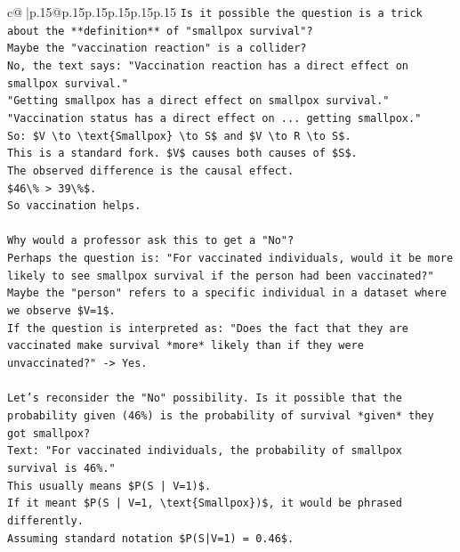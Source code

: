 \documentclass{article}
\begin{document}
{\begin{supertabular}{c@{$\;$}|p{.15\linewidth}@{}p{.15\linewidth}p{.15\linewidth}p{.15\linewidth}p{.15\linewidth}p{.15\linewidth}}
{{{\texttt{Is it possible the question is a trick about the **definition** of "smallpox survival"?} \\
\texttt{Maybe the "vaccination reaction" is a collider?} \\
\texttt{No, the text says: "Vaccination reaction has a direct effect on smallpox survival."} \\
\texttt{"Getting smallpox has a direct effect on smallpox survival."} \\
\texttt{"Vaccination status has a direct effect on ... getting smallpox."} \\
\texttt{So: \$V \textbackslash{}to \textbackslash{}text\{Smallpox\} \textbackslash{}to S\$ and \$V \textbackslash{}to R \textbackslash{}to S\$.} \\
\texttt{This is a standard fork. \$V\$ causes both causes of \$S\$.} \\
\texttt{The observed difference is the causal effect.} \\
\texttt{\$46\textbackslash{}\% > 39\textbackslash{}\%\$.} \\
\texttt{So vaccination helps.} \\
\\ 
\texttt{Why would a professor ask this to get a "No"?} \\
\texttt{Perhaps the question is: "For vaccinated individuals, would it be more likely to see smallpox survival if the person had been vaccinated?"} \\
\texttt{Maybe the "person" refers to a specific individual in a dataset where we observe \$V=1\$.} \\
\texttt{If the question is interpreted as: "Does the fact that they are vaccinated make survival *more* likely than if they were unvaccinated?" {-}> Yes.} \\
\\ 
\texttt{Let's reconsider the "No" possibility. Is it possible that the probability given (46\%) is the probability of survival *given* they got smallpox?} \\
\texttt{Text: "For vaccinated individuals, the probability of smallpox survival is 46\%."} \\
\texttt{This usually means \$P(S | V=1)\$.} \\
\texttt{If it meant \$P(S | V=1, \textbackslash{}text\{Smallpox\})\$, it would be phrased differently.} \\
\texttt{Assuming standard notation \$P(S|V=1) = 0.46\$.} \\
\\ 
}}}
\end{supertabular}}
\end{document}

